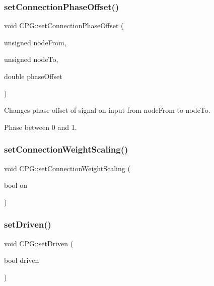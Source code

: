 \subsubsection{\texorpdfstring{set\+Connection\+Phase\+Offset()}{setConnectionPhaseOffset()}}
{\footnotesize\ttfamily void C\+P\+G\+::set\+Connection\+Phase\+Offset (\begin{DoxyParamCaption}\item[{unsigned}]{node\+From,  }\item[{unsigned}]{node\+To,  }\item[{double}]{phase\+Offset }\end{DoxyParamCaption})}



Changes phase offset of signal on input from node\+From to node\+To. 

Phase between 0 and 1. \mbox{\label{classCPG_a78a7b481668202d413e5630f5803da3c}} 
\subsubsection{\texorpdfstring{set\+Connection\+Weight\+Scaling()}{setConnectionWeightScaling()}}
{\footnotesize\ttfamily void C\+P\+G\+::set\+Connection\+Weight\+Scaling (\begin{DoxyParamCaption}\item[{bool}]{on }\end{DoxyParamCaption})}

\mbox{\label{classCPG_a71cc2187f75bf57bc050d95cce839812}} 
\subsubsection{\texorpdfstring{set\+Driven()}{setDriven()}}
{\footnotesize\ttfamily void C\+P\+G\+::set\+Driven (\begin{DoxyParamCaption}\item[{bool}]{driven }\end{DoxyParamCaption})}

\mbox{\label{classCPG_a06766b4d48cbd149935513273dcaecb1}} 
